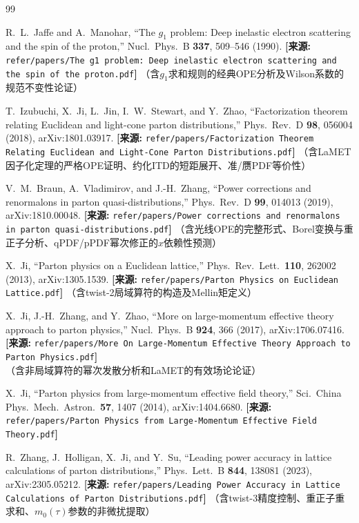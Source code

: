 \documentclass[12pt,a4paper]{ctexart}
\theoremstyle{definition}
\begin{document}
\begin{thebibliography}{99}

R.~L.~Jaffe and A.~Manohar,
``The $g_1$ problem: Deep inelastic electron scattering and the spin of the proton,''
Nucl.\ Phys.\ B \textbf{337}, 509--546 (1990).
\quad\textbf{[来源:} \texttt{refer/papers/The g1 problem: Deep inelastic electron scattering and the spin of the proton.pdf}\textbf{]}
（含$g_1$求和规则的经典OPE分析及Wilson系数的规范不变性论证）

T.~Izubuchi, X.~Ji, L.~Jin, I.~W.~Stewart, and Y.~Zhao,
``Factorization theorem relating Euclidean and light-cone parton distributions,''
Phys.\ Rev.\ D \textbf{98}, 056004 (2018), arXiv:1801.03917.
\quad\textbf{[来源:} \texttt{refer/papers/Factorization Theorem Relating Euclidean and Light-Cone Parton Distributions.pdf}\textbf{]}
（含LaMET因子化定理的严格OPE证明、约化ITD的短距展开、准/赝PDF等价性）

V.~M.~Braun, A.~Vladimirov, and J.-H.~Zhang,
``Power corrections and renormalons in parton quasi-distributions,''
Phys.\ Rev.\ D \textbf{99}, 014013 (2019), arXiv:1810.00048.
\quad\textbf{[来源:} \texttt{refer/papers/Power corrections and renormalons in parton quasi-distributions.pdf}\textbf{]}
（含光线OPE的完整形式、Borel变换与重正子分析、qPDF/pPDF幂次修正的$x$依赖性预测）

X.~Ji,
``Parton physics on a Euclidean lattice,''
Phys.\ Rev.\ Lett.\ \textbf{110}, 262002 (2013), arXiv:1305.1539.
\quad\textbf{[来源:} \texttt{refer/papers/Parton Physics on Euclidean Lattice.pdf}\textbf{]}
（含twist-2局域算符的构造及Mellin矩定义）

X.~Ji, J.-H.~Zhang, and Y.~Zhao,
``More on large-momentum effective theory approach to parton physics,''
Nucl.\ Phys.\ B \textbf{924}, 366 (2017), arXiv:1706.07416.
\quad\textbf{[来源:} \texttt{refer/papers/More On Large-Momentum Effective Theory Approach to Parton Physics.pdf}\textbf{]}
（含非局域算符的幂次发散分析和LaMET的有效场论论证）

X.~Ji,
``Parton physics from large-momentum effective field theory,''
Sci.\ China Phys.\ Mech.\ Astron.\ \textbf{57}, 1407 (2014), arXiv:1404.6680.
\quad\textbf{[来源:} \texttt{refer/papers/Parton Physics from Large-Momentum Effective Field Theory.pdf}\textbf{]}

R.~Zhang, J.~Holligan, X.~Ji, and Y.~Su,
``Leading power accuracy in lattice calculations of parton distributions,''
Phys.\ Lett.\ B \textbf{844}, 138081 (2023), arXiv:2305.05212.
\quad\textbf{[来源:} \texttt{refer/papers/Leading Power Accuracy in Lattice Calculations of Parton Distributions.pdf}\textbf{]}
（含twist-3精度控制、重正子重求和、$m_0(\tau)$参数的非微扰提取）


\end{thebibliography}
\end{document}
